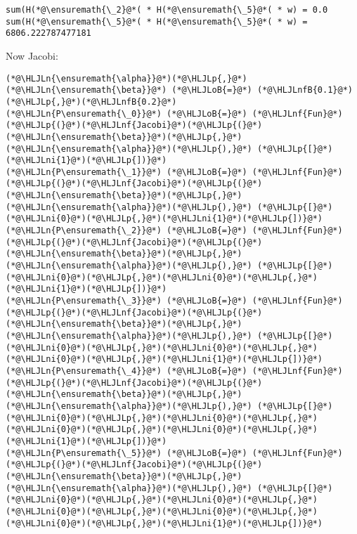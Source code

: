 \documentclass[12pt,a4paper]{article}
\newcommand{\HLJLn}[1]{#1}
\newcommand{\HLJLnf}[1]{\textcolor[RGB]{66,102,213}{#1}}
\newcommand{\HLJLnfB}[1]{\textcolor[RGB]{59,151,46}{#1}}
\newcommand{\HLJLni}[1]{\textcolor[RGB]{59,151,46}{#1}}
\newcommand{\HLJLoB}[1]{\textcolor[RGB]{102,102,102}{\textbf{#1}}}
\newcommand{\HLJLp}[1]{#1}
\begin{document}
\begin{lstlisting}
sum(H(*@\ensuremath{\_2}@*( * H(*@\ensuremath{\_5}@*( * w) = 0.0
sum(H(*@\ensuremath{\_5}@*( * H(*@\ensuremath{\_5}@*( * w) = 6806.222787477181
\end{lstlisting}


Now Jacobi:


\begin{lstlisting}
(*@\HLJLn{\ensuremath{\alpha}}@*)(*@\HLJLp{,}@*)(*@\HLJLn{\ensuremath{\beta}}@*) (*@\HLJLoB{=}@*) (*@\HLJLnfB{0.1}@*)(*@\HLJLp{,}@*)(*@\HLJLnfB{0.2}@*)
(*@\HLJLn{P\ensuremath{\_0}}@*) (*@\HLJLoB{=}@*) (*@\HLJLnf{Fun}@*)(*@\HLJLp{(}@*)(*@\HLJLnf{Jacobi}@*)(*@\HLJLp{(}@*)(*@\HLJLn{\ensuremath{\beta}}@*)(*@\HLJLp{,}@*)(*@\HLJLn{\ensuremath{\alpha}}@*)(*@\HLJLp{),}@*) (*@\HLJLp{[}@*)(*@\HLJLni{1}@*)(*@\HLJLp{])}@*)
(*@\HLJLn{P\ensuremath{\_1}}@*) (*@\HLJLoB{=}@*) (*@\HLJLnf{Fun}@*)(*@\HLJLp{(}@*)(*@\HLJLnf{Jacobi}@*)(*@\HLJLp{(}@*)(*@\HLJLn{\ensuremath{\beta}}@*)(*@\HLJLp{,}@*)(*@\HLJLn{\ensuremath{\alpha}}@*)(*@\HLJLp{),}@*) (*@\HLJLp{[}@*)(*@\HLJLni{0}@*)(*@\HLJLp{,}@*)(*@\HLJLni{1}@*)(*@\HLJLp{])}@*)
(*@\HLJLn{P\ensuremath{\_2}}@*) (*@\HLJLoB{=}@*) (*@\HLJLnf{Fun}@*)(*@\HLJLp{(}@*)(*@\HLJLnf{Jacobi}@*)(*@\HLJLp{(}@*)(*@\HLJLn{\ensuremath{\beta}}@*)(*@\HLJLp{,}@*)(*@\HLJLn{\ensuremath{\alpha}}@*)(*@\HLJLp{),}@*) (*@\HLJLp{[}@*)(*@\HLJLni{0}@*)(*@\HLJLp{,}@*)(*@\HLJLni{0}@*)(*@\HLJLp{,}@*)(*@\HLJLni{1}@*)(*@\HLJLp{])}@*)
(*@\HLJLn{P\ensuremath{\_3}}@*) (*@\HLJLoB{=}@*) (*@\HLJLnf{Fun}@*)(*@\HLJLp{(}@*)(*@\HLJLnf{Jacobi}@*)(*@\HLJLp{(}@*)(*@\HLJLn{\ensuremath{\beta}}@*)(*@\HLJLp{,}@*)(*@\HLJLn{\ensuremath{\alpha}}@*)(*@\HLJLp{),}@*) (*@\HLJLp{[}@*)(*@\HLJLni{0}@*)(*@\HLJLp{,}@*)(*@\HLJLni{0}@*)(*@\HLJLp{,}@*)(*@\HLJLni{0}@*)(*@\HLJLp{,}@*)(*@\HLJLni{1}@*)(*@\HLJLp{])}@*)
(*@\HLJLn{P\ensuremath{\_4}}@*) (*@\HLJLoB{=}@*) (*@\HLJLnf{Fun}@*)(*@\HLJLp{(}@*)(*@\HLJLnf{Jacobi}@*)(*@\HLJLp{(}@*)(*@\HLJLn{\ensuremath{\beta}}@*)(*@\HLJLp{,}@*)(*@\HLJLn{\ensuremath{\alpha}}@*)(*@\HLJLp{),}@*) (*@\HLJLp{[}@*)(*@\HLJLni{0}@*)(*@\HLJLp{,}@*)(*@\HLJLni{0}@*)(*@\HLJLp{,}@*)(*@\HLJLni{0}@*)(*@\HLJLp{,}@*)(*@\HLJLni{0}@*)(*@\HLJLp{,}@*)(*@\HLJLni{1}@*)(*@\HLJLp{])}@*)
(*@\HLJLn{P\ensuremath{\_5}}@*) (*@\HLJLoB{=}@*) (*@\HLJLnf{Fun}@*)(*@\HLJLp{(}@*)(*@\HLJLnf{Jacobi}@*)(*@\HLJLp{(}@*)(*@\HLJLn{\ensuremath{\beta}}@*)(*@\HLJLp{,}@*)(*@\HLJLn{\ensuremath{\alpha}}@*)(*@\HLJLp{),}@*) (*@\HLJLp{[}@*)(*@\HLJLni{0}@*)(*@\HLJLp{,}@*)(*@\HLJLni{0}@*)(*@\HLJLp{,}@*)(*@\HLJLni{0}@*)(*@\HLJLp{,}@*)(*@\HLJLni{0}@*)(*@\HLJLp{,}@*)(*@\HLJLni{0}@*)(*@\HLJLp{,}@*)(*@\HLJLni{1}@*)(*@\HLJLp{])}@*)


\end{lstlisting}
\end{document}
